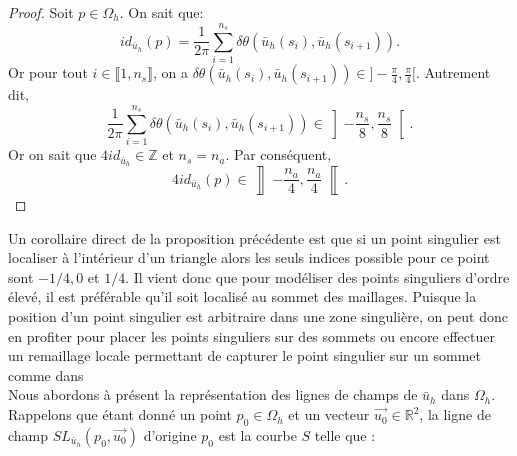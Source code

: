 \begin{proof}
Soit $p\in\Omega_h$. On sait que:
$$
id_{\bar{u}_h}(p)=\displaystyle\frac{1}{2\pi}\sum_{i=1}^{n_s}\delta\theta(\bar{u}_h(s_i),\bar{u}_h(s_{i+1})).
$$
Or pour tout $i\in\llbracket 1, n_s\rrbracket$, on a $\delta\theta(\bar{u}_h(s_i),\bar{u}_h(s_{i+1}))\in]-\frac{\pi}{4}, \frac{\pi}{4}[$. Autrement dit,
$$
\displaystyle\frac{1}{2\pi}\sum_{i=1}^{n_s}\delta\theta(\bar{u}_h(s_i),\bar{u}_h(s_{i+1}))\in\left]-\frac{n_s}{8}, \frac{n_s}{8}\right[.
$$
Or on sait que $4id_{\bar{u}_h}\in\mathbb{Z}$ et $n_s=n_a$. Par conséquent,
$$
4id_{\bar{u}_h}(p)\in\left\rrbracket-\frac{n_a}{4}, \frac{n_a}{4}\right\llbracket.
$$
\end{proof}
Un corollaire direct de la proposition précédente est que si un point singulier est localiser à l'intérieur d'un triangle alors les seuls indices possible pour ce point sont $-1/4, 0$ et $1/4$. Il vient donc que pour modéliser des points singuliers d'ordre élevé, il est préférable qu'il soit localisé au sommet des maillages. Puisque la position d'un point singulier est arbitraire dans une zone singulière, on peut donc en profiter pour placer les points singuliers sur des sommets ou encore effectuer un remaillage locale permettant de capturer le point singulier sur un sommet comme dans \cite{jezdimirovic2021quad}\\

Nous abordons à présent la représentation des lignes de champs de $\bar{u}_h$ dans $\Omega_h$. Rappelons que étant donné un point $p_0\in\Omega_h$ et un vecteur $\overrightarrow{u_0}\in\mathbb{R}^2$, la ligne de champ $SL_{\bar{u}_h}(p_0, \overrightarrow{u_0})$ d'origine $p_0$ est la courbe $S$ telle que :

